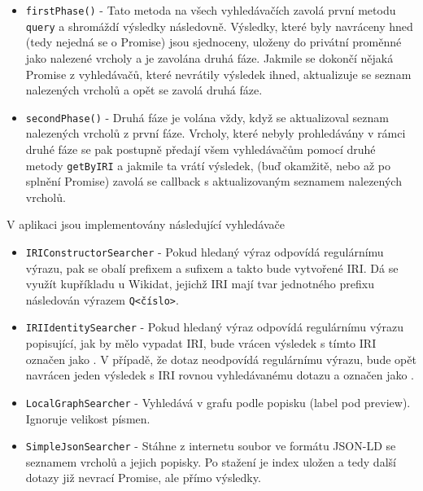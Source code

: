 \begin{itemize}
  \item \texttt{firstPhase()} - Tato metoda na všech vyhledávačích zavolá první metodu \texttt{query} a shromáždí výsledky následovně. Výsledky, které byly navráceny hned (tedy nejedná se o Promise) jsou sjednoceny, uloženy do privátní proměnné jako nalezené vrcholy a je zavolána druhá fáze. Jakmile se dokončí nějaká Promise z vyhledávačů, které nevrátily výsledek ihned, aktualizuje se seznam nalezených vrcholů a opět se zavolá druhá fáze.
  \item \texttt{secondPhase()} - Druhá fáze je volána vždy, když se aktualizoval seznam nalezených vrcholů z první fáze. Vrcholy, které nebyly prohledávány v rámci druhé fáze se pak postupně předají všem vyhledávačům pomocí druhé metody \texttt{getByIRI} a jakmile ta vrátí výsledek, (buď okamžitě, nebo až po splnění Promise) zavolá se callback s aktualizovaným seznamem nalezených vrcholů.
\end{itemize}

\bigskip

V aplikaci jsou implementovány následující vyhledávače
\begin{itemize}
  \item \texttt{IRIConstructorSearcher} - Pokud hledaný výraz odpovídá regulárnímu výrazu, pak se obalí prefixem a sufixem a takto bude vytvořené IRI. Dá se využít kupříkladu u Wikidat, jejichž IRI mají tvar jednotného prefixu následován výrazem \texttt{Q<číslo>}.
  \item \texttt{IRIIdentitySearcher} - Pokud hledaný výraz odpovídá regulárnímu výrazu popisující, jak by mělo vypadat IRI, bude vrácen výsledek s tímto IRI označen jako . V případě, že dotaz neodpovídá regulárnímu výrazu, bude opět navrácen jeden výsledek s IRI rovnou vyhledávanému dotazu a označen jako .
  \item \texttt{LocalGraphSearcher} - Vyhledává v grafu podle popisku (label pod preview). Ignoruje velikost písmen.
  \item \texttt{SimpleJsonSearcher} - Stáhne z internetu soubor ve formátu JSON-LD se seznamem vrcholů a jejich popisky. Po stažení je index uložen a tedy další dotazy již nevrací Promise, ale přímo výsledky.
\end{itemize}


